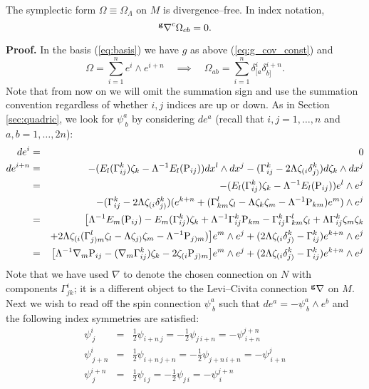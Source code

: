 \begin{lemma} \label{lem:div_free} The symplectic form $\Omega\equiv\Omega_\Lambda$ on $M$ is divergence--free. In index notation,
\[
{^{\bf g}\nabla}^c\Omega_{cb}=0.
\]
\end{lemma}

{\bf Proof.} In the basis
(\ref{eq:basis}) we have $g$ as above (\ref{eq:g_cov_const})
and
\[
\Omega=\sum_{i=1}^{n}e^{i}\wedge e^{i+n}\quad\implies\quad\Omega_{ab}=\sum_{i=1}^{n}\delta_{[a}^{i}\delta_{b]}^{i+n}.
\]
Note that from now on we will omit the summation sign and use the
summation convention regardless of whether $i,j$ indices are up or
down. As in Section \ref{sec:quadric}, we look for $\psi_{\ b}^{a}$
by considering $ de^{a}$ (recall that $i,j=1,\dots,n$ and
$a,b=1,\dots,2n$):
\begin{eqnarray*}
 de^{i} & = & 0\\
 de^{i+n} & = & -(E_{l}(\Gamma_{ij}^{k})\zeta_{k}-\Lambda^{-1}E_{l}(\mathrm{P}_{ij})) dx^{l}\wedge dx^{j}-(\Gamma_{ij}^{k}-2\Lambda \zeta_{(i}\delta_{j)}^{k}) d\zeta_{k}\wedge dx^{j}\\
 & = & -(E_{l}(\Gamma_{ij}^{k})\zeta_{k}-\Lambda^{-1}E_{l}(\mathrm{P}_{ij}))e^{l}\wedge e^{j}\\
 &  & -(\Gamma_{ij}^{k}-2\Lambda \zeta_{(i}\delta_{j)}^{k})(e^{k+n}+(\Gamma_{km}^{l}\zeta_{l}-\Lambda \zeta_{k}\zeta_{m}-\Lambda^{-1}\mathrm{P}_{km})e^{m})\wedge e^{j}\\
 & = & \bigl[\Lambda^{-1}E_{m}(\mathrm{P}_{ij})-E_{m}(\Gamma_{ij}^{k})\zeta_{k}+\Lambda^{-1}\Gamma_{ij}^{k}\mathrm{P}_{km}-\Gamma_{ij}^{k}\Gamma_{km}^{l}\zeta_{l}+\Lambda\Gamma_{ij}^{k}\zeta_{m}\zeta_{k}\\
 &  & +2\Lambda \zeta_{(i}(\Gamma_{j)m}^{l}\zeta_{l}-\Lambda \zeta_{j)}\zeta_{m}-\Lambda^{-1}\mathrm{P}_{j)m})\bigr]e^{m}\wedge e^{j}+(2\Lambda \zeta_{(i}\delta_{j)}^{k}-\Gamma_{ij}^{k})e^{k+n}\wedge e^{j}\\
 & = & \bigl[\Lambda^{-1}{\nabla}_{m}\mathrm{P}_{ij}-({\nabla}_{m}\Gamma_{ij}^{k})\zeta_{k}-2\zeta_{(i}\mathrm{P}_{j)m}\bigr]e^{m}\wedge e^{j}+(2\Lambda \zeta_{(i}\delta_{j)}^{k}-\Gamma_{ij}^{k})e^{k+n}\wedge e^{j}\\
\end{eqnarray*}
Note that we have used ${\nabla}$ to denote the chosen connection on $N$
with components $\Gamma_{jk}^{i}$; it is a different object to the Levi--Civita connection $^{\bf g}\nabla$ on $M$. Next we wish to read off the spin
connection $\psi_{\ b}^{a}$ such that ${d}e^{a}=-\psi_{\ b}^{a}\wedge e^{b}$
and the following index symmetries are satisfied:
\begin{eqnarray*}
\psi_{\ j}^{i} & = & \frac{1}{2}\psi_{i+n\, j}=-\frac{1}{2}\psi_{j\, i+n}=-\psi_{\ i+n}^{j+n}\\
\psi_{\ j+n}^{i} & = & \frac{1}{2}\psi_{i+n\, j+n}=-\frac{1}{2}\psi_{j+n\, i+n}=-\psi_{\ i+n}^{j}\\
\psi_{\ j}^{i+n} & = & \frac{1}{2}\psi_{i\, j}=-\frac{1}{2}\psi_{j\, i}=-\psi_{\ i}^{j+n}
\end{eqnarray*}
